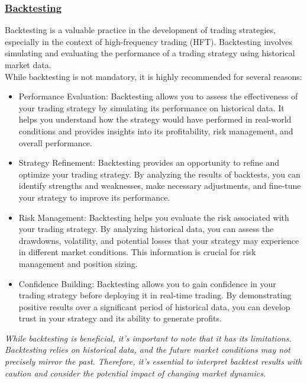 \documentclass{assignment}
\begin{document}
\begin{problem}
\subsubsection*{\underline{Backtesting}}

\noindent Backtesting is a valuable practice in the development of trading strategies, especially in the context of high-frequency trading (HFT). Backtesting involves simulating and evaluating the performance of a trading strategy using historical market data. \\
While backtesting is not mandatory, it is highly recommended for several reasons:
\begin{itemize}
    \item Performance Evaluation: Backtesting allows you to assess the effectiveness of your trading strategy by simulating its performance on historical data. It helps you understand how the strategy would have performed in real-world conditions and provides insights into its profitability, risk management, and overall performance.
    \item Strategy Refinement: Backtesting provides an opportunity to refine and optimize your trading strategy. By analyzing the results of backtests, you can identify strengths and weaknesses, make necessary adjustments, and fine-tune your strategy to improve its performance.
    \item Risk Management: Backtesting helps you evaluate the risk associated with your trading strategy. By analyzing historical data, you can assess the drawdowns, volatility, and potential losses that your strategy may experience in different market conditions. This information is crucial for risk management and position sizing.
    \item Confidence Building: Backtesting allows you to gain confidence in your trading strategy before deploying it in real-time trading. By demonstrating positive results over a significant period of historical data, you can develop trust in your strategy and its ability to generate profits.
\end{itemize}

\noindent \textit{While backtesting is beneficial, it's important to note that it has its limitations. Backtesting relies on historical data, and the future market conditions may not precisely mirror the past. Therefore, it's essential to interpret backtest results with caution and consider the potential impact of changing market dynamics.}\\\\


\end{problem}
\end{document}
